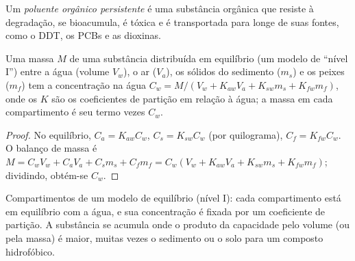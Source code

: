 \begin{definition}\label{def:b3:environmental-toxicology:pop}
Um \emph{poluente orgânico persistente} é uma
substância orgânica que resiste à degradação, se bioacumula, é tóxica e é
transportada para longe de suas fontes, como o DDT, os PCBs e as dioxinas.
\end{definition}

\begin{proposition}\label{prop:b3:environmental-toxicology:level-one}
Uma massa $M$ de uma substância distribuída em equilíbrio (um modelo de ``nível I'') entre a água
(volume $V_w$), o ar ($V_a$), os sólidos do sedimento ($m_s$) e os peixes ($m_f$) tem a concentração na água
$C_w = M/(V_w + K_{aw}V_a + K_{sw}m_s + K_{fw}m_f)$, onde os $K$ são os coeficientes de partição em relação à
água; a massa em cada compartimento é seu termo vezes $C_w$.
\end{proposition}

\begin{proof}
No equilíbrio, $C_a = K_{aw}C_w$, $C_s = K_{sw}C_w$ (por quilograma), $C_f = K_{fw}C_w$. O balanço de massa é
$M = C_wV_w + C_aV_a + C_sm_s + C_fm_f = C_w(V_w + K_{aw}V_a + K_{sw}m_s + K_{fw}m_f)$; dividindo, obtém-se $C_w$.
\end{proof}

\begin{omfigure}

{\small Compartimentos de um modelo de equilíbrio (nível I): cada compartimento está em
equilíbrio com a água, e sua concentração é fixada por um coeficiente de partição.
A substância se acumula onde o produto da capacidade pelo volume (ou pela massa) é
maior, muitas vezes o sedimento ou o solo para um composto hidrofóbico.}
\end{omfigure}

